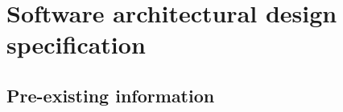 \section{Software architectural design specification}
%
%

\subsection{Pre-existing information}
%

